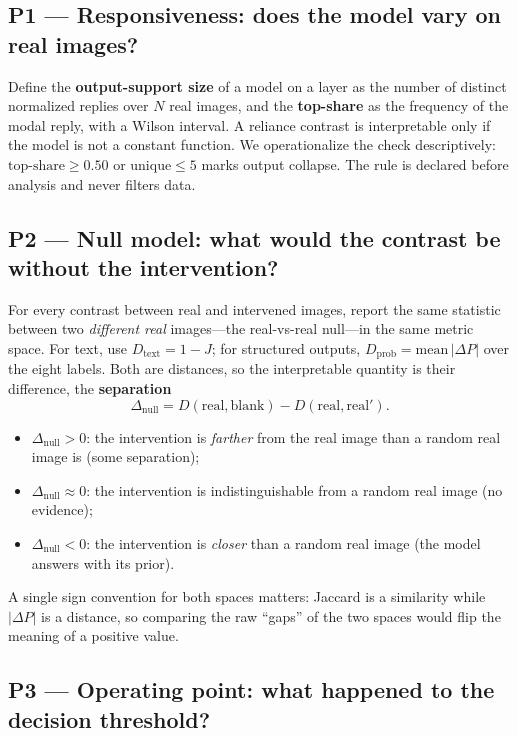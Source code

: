 \subsection{P1 --- Responsiveness: does the model vary on real images?}

Define the \textbf{output-support size} of a model on a layer as the number of distinct normalized replies over $N$ real images, and the \textbf{top-share} as the frequency of the modal reply, with a Wilson interval. A reliance contrast is interpretable only if the model is not a constant function. We operationalize the check descriptively: $\text{top-share} \ge 0.50$ or $\text{unique} \le 5$ marks output collapse. The rule is declared before analysis and never filters data.

\subsection{P2 --- Null model: what would the contrast be without the intervention?}

For every contrast between real and intervened images, report the same statistic between two \emph{different real} images---the real-vs-real null---in the same metric space. For text, use $D_{\text{text}} = 1-J$; for structured outputs, $D_{\text{prob}} = \text{mean}\,|\Delta P|$ over the eight labels. Both are distances, so the interpretable quantity is their difference, the \textbf{separation}
\[
\Delta_{\text{null}} = D(\text{real},\text{blank}) - D(\text{real},\text{real}').
\]
\begin{itemize}[leftmargin=1.2em,itemsep=1pt,topsep=2pt]
\item $\Delta_{\text{null}} > 0$: the intervention is \emph{farther} from the real image than a random real image is (some separation);
\item $\Delta_{\text{null}} \approx 0$: the intervention is indistinguishable from a random real image (no evidence);
\item $\Delta_{\text{null}} < 0$: the intervention is \emph{closer} than a random real image (the model answers with its prior).
\end{itemize}
A single sign convention for both spaces matters: Jaccard is a similarity while $|\Delta P|$ is a distance, so comparing the raw ``gaps'' of the two spaces would flip the meaning of a positive value.

\subsection{P3 --- Operating point: what happened to the decision threshold?}

